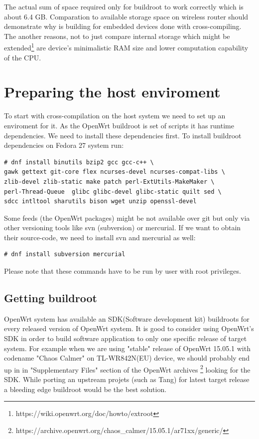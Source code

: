 The actual sum of space required only for buildroot to work correctly which is about 6.4 GB.
Comparation to available storage space on wireless router should demonstrate why is building for embedded devices done with cross-compiling.
The another reasons, not to just compare internal storage which might be extended\footnote{https://wiki.openwrt.org/doc/howto/extroot} are device's minimalistic RAM size and lower computation capability of the CPU.



\section{Preparing the host enviroment}

To start with cross-compilation on the host system we need to set up an enviroment for it.
As the OpenWrt buildroot is set of scripts it has runtime dependencies.
We need to install these dependencies first.
To install buildroot dependencies on Fedora 27 system run:
\begin{lstlisting}[columns=fixed,basicstyle=\ttfamily\footnotesize,tabsize=4,backgroundcolor=\color{yellow!10}]
# dnf install binutils bzip2 gcc gcc-c++ \
gawk gettext git-core flex ncurses-devel ncurses-compat-libs \
zlib-devel zlib-static make patch perl-ExtUtils-MakeMaker \
perl-Thread-Queue  glibc glibc-devel glibc-static quilt sed \
sdcc intltool sharutils bison wget unzip openssl-devel
\end{lstlisting}
Some feeds (the OpenWrt packages) might be not available over git but only via other versioning tools like svn (subversion) or mercurial.
If we want to obtain their source-code, we need to install svn and mercurial as well:
\begin{lstlisting}[columns=fixed,basicstyle=\ttfamily\footnotesize,tabsize=4,backgroundcolor=\color{yellow!10}]
# dnf install subversion mercurial
\end{lstlisting}
Please note that these commands have to be run by user with root privileges.



\subsection{Getting buildroot}

OpenWrt system has available an SDK(Software development kit) buildroots for every released version of OpenWrt system.
It is good to consider using OpenWrt's SDK in order to build software application to only one specific release of target system.
For example when we are using "stable" release of OpenWrt 15.05.1 with codename "Chaos Calmer" on TL-WR842N(EU) device, we should probably end up in in "Supplementary Files" section of the OpenWrt archives
\footnote{https://archive.openwrt.org/chaos\_calmer/15.05.1/ar71xx/generic/} looking for the SDK.
While porting an upstream projets (such as Tang) for latest target release a bleeding edge buildroot would be the best solution.

